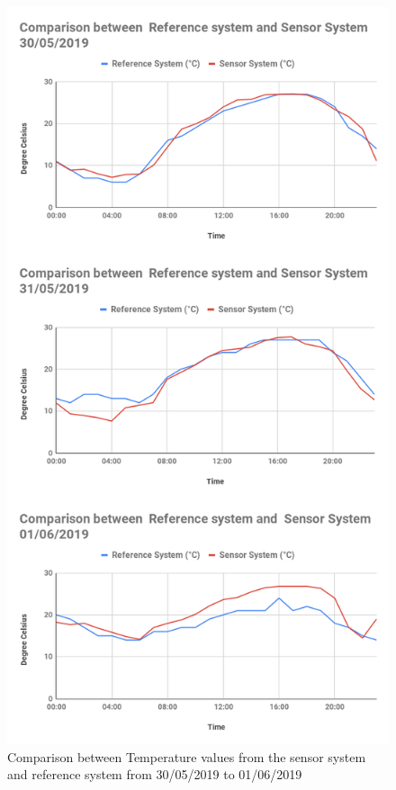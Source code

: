 \begin{figure}[h]
    \begin{center}
    \includegraphics[scale=0.36]{images/figure85tem.png}
    \end{center}
    \caption{Comparison between Temperature values from the sensor system and reference system from 30/05/2019 to 01/06/2019}
  \label{temp}
  
  \end{figure}
  
